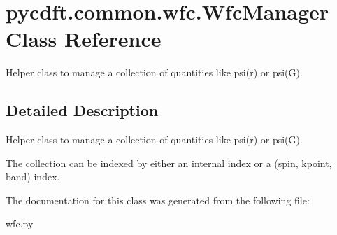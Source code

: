 \hypertarget{classpycdft_1_1common_1_1wfc_1_1WfcManager}{\section{pycdft.\-common.\-wfc.\-Wfc\-Manager Class Reference}
\label{classpycdft_1_1common_1_1wfc_1_1WfcManager}
}


Helper class to manage a collection of quantities like psi(r) or psi(\-G).  




\subsection{Detailed Description}
Helper class to manage a collection of quantities like psi(r) or psi(\-G). 

The collection can be indexed by either an internal index or a (spin, kpoint, band) index. 

The documentation for this class was generated from the following file\-:\begin{DoxyCompactItemize}
\item 
wfc.\-py\end{DoxyCompactItemize}
